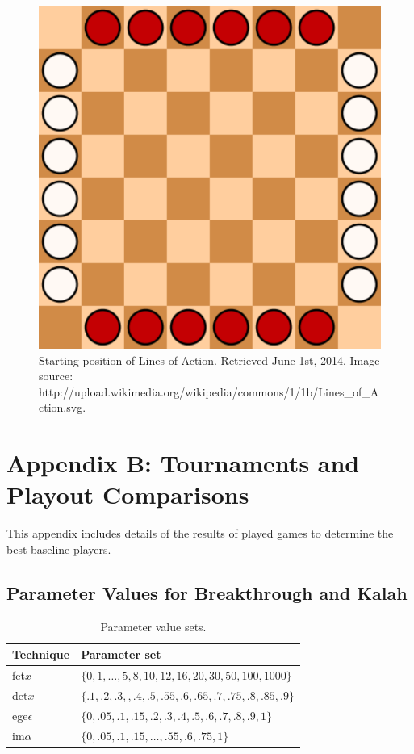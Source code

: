 \documentclass{article}
\begin{document}
\begin{figure}[h!]
\begin{center}
\includegraphics[scale=0.4]{images/LOA}
\end{center}
\caption{Starting position of Lines of Action. 
Retrieved June 1st, 2014. 
Image source: http://upload.wikimedia.org/wikipedia/commons/1/1b/Lines\_of\_Action.svg. 
\label{fig:loa-image}}
\end{figure}

\section{Appendix B: Tournaments and Playout Comparisons}
\label{app:results}

This appendix includes details of the results of played games to determine the best baseline players. 

\subsection{Parameter Values for Breakthrough and Kalah}

\begin{table}[h!]
\begin{center}
\begin{tabular}{|l|l|}
\hline
Technique & Parameter set \\
\hline
fet$x$          & $\{ 0, 1, \ldots, 5, 8, 10, 12, 16, 20, 30, 50, 100, 1000 \}$ \\
det$x$         & $\{ .1, .2, .3, , .4, .5, .55, .6, .65, .7, .75, .8, .85, .9 \}$ \\
ege$\epsilon$  & $\{ 0, .05, .1, .15, .2, .3, .4, .5, .6, .7, .8, .9, 1 \}$ \\
im$\alpha$     & $\{ 0, .05, .1, .15, \ldots, .55, .6, .75, 1 \}$ \\
\hline
\end{tabular}
\end{center}
\caption{Parameter value sets.}
\label{tbl:parmsets}
\end{table}
\end{document}
